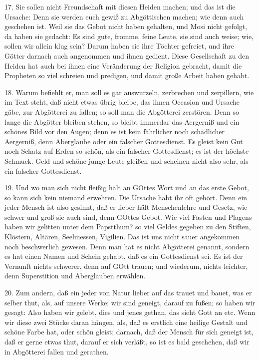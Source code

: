 17. Sie sollen nicht Freundschaft mit diesen Heiden machen; und das ist die Ursache: Denn sie werden euch gewiß zu Abgöttischen machen;
wie denn auch geschehen ist. Weil sie das Gebot nicht haben gehalten, und Mosi nicht gefolgt, da haben sie gedacht: Es sind gute, fromme, feine Leute, sie sind auch weise; wie, sollen wir allein klug sein? Darum haben sie ihre Töchter gefreiet, und ihre Götter darnach auch angenommen und ihnen gedient. Diese Gesellschaft zu den Heiden hat auch bei ihnen eine Veränderung der Religion gebracht, damit die Propheten so viel schreien und predigen, und damit große Arbeit haben gehabt.

18. Warum befiehlt er, man soll es gar auswurzeln, zerbrechen und zerpillern, wie im Text steht, daß nicht etwas übrig bleibe, das ihnen Occasion und Ursache gäbe, zur Abgötterei zu fallen; so soll man die Abgötterei zerstören. Denn so lange die Abgötter bleiben stehen, so bleibt immerdar das Aergerniß und ein schönes Bild vor den Augen; denn es ist kein fährlicher noch schädlicher Aergerniß, denn Aberglaube oder ein falscher Gottesdienst. Es gleist kein Gut noch Schatz auf Erden so schön, als ein falscher Gottesdienst; es ist der höchste Schmuck. Geld und schöne junge Leute gleißen und scheinen nicht also sehr, als ein falscher Gottesdienst.

19. Und wo man sich nicht fleißig hält an GOttes Wort und an das erste Gebot, so kann sich kein niemand erwehren. Die Ursache habt ihr oft gehört. Denn ein jeder Mensch ist also gesinnt, daß er lieber hält Menschenlehre und Gesetz, wie schwer und groß sie auch sind, denn GOttes Gebot. Wie viel Fasten und Plagens haben wir gelitten unter dem Papstthum? so viel Geldes gegeben zu den Stiften, Klöstern, Altären, Seelmessen, Vigilien. Das ist uns nicht sauer angekommen noch beschwerlich gewesen. Denn man hat es nicht Abgötterei genannt, sondern es hat einen Namen und Schein gehabt, daß es ein Gottesdienst sei. Es ist der Vernunft nichts schwerer, denn auf GOtt trauen; und wiederum, nichts leichter, denn Superstition und Aberglauben erwählen.

20. Zum andern, daß ein jeder von Natur lieber auf das trauet und bauet, was er selber thut, als, auf unsere Werke; wir sind geneigt, darauf zu fußen; so haben wir gesagt: Also haben wir gelebt, dies und jenes gethan, das sieht Gott an etc. Wenn wir diese zwei Stücke daran hängen, als, daß es erstlich eine heilige Gestalt und schöne Farbe hat, oder schön gleist; darnach, daß der Mensch für sich geneigt ist, daß er gerne etwas thut, darauf er sich verläßt, so ist es bald geschehen, daß wir in Abgötterei fallen und gerathen.

